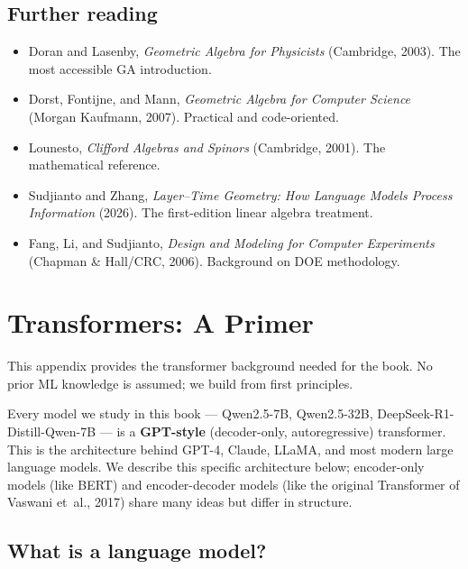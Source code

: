 \documentclass[11pt, twoside, openright]{memoir}
\begin{document}
\section{Further reading}

\begin{itemize}[nosep]
\item Doran and Lasenby, \emph{Geometric Algebra for Physicists}
  (Cambridge, 2003).  The most accessible GA introduction.
\item Dorst, Fontijne, and Mann, \emph{Geometric Algebra for Computer
  Science} (Morgan Kaufmann, 2007).  Practical and code-oriented.
\item Lounesto, \emph{Clifford Algebras and Spinors} (Cambridge, 2001).
  The mathematical reference.
\item Sudjianto and Zhang, \emph{Layer--Time Geometry: How Language
  Models Process Information} (2026).  The first-edition linear algebra
  treatment.
\item Fang, Li, and Sudjianto, \emph{Design and Modeling for Computer
  Experiments} (Chapman \& Hall/CRC, 2006).  Background on DOE
  methodology.
\end{itemize}


\appendix


\chapter{Transformers: A Primer}
\label{app:transformers}

This appendix provides the transformer background needed for the book.
No prior ML knowledge is assumed; we build from first principles.

Every model we study in this book --- Qwen2.5-7B, Qwen2.5-32B,
DeepSeek-R1-Distill-Qwen-7B --- is a \textbf{GPT-style}
(decoder-only, autoregressive) transformer.  This is the architecture
behind GPT-4, Claude, LLaMA, and most modern large language models.
We describe this specific architecture below; encoder-only models
(like BERT) and encoder-decoder models (like the original Transformer
of Vaswani et~al., 2017) share many ideas but differ in structure.

\section{What is a language model?}
\end{document}
